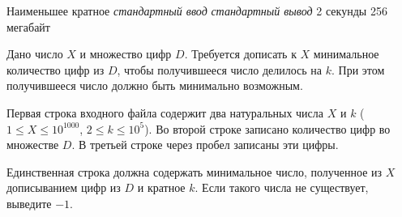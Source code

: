\begin{problem}%
{Наименьшее кратное}%
{\textsl{стандартный ввод}}%
{\textsl{стандартный вывод}}%
{2 секунды}%
{256 мегабайт}{}

Дано число $X$ и множество цифр $D$. Требуется дописать к $X$ минимальное количество цифр из $D$, чтобы получившееся число делилось на $k$. При этом получившееся число должно быть минимально возможным.

\InputFile

Первая строка входного файла содержит два натуральных числа $X$ и $k$ ($1 \leqslant X \leqslant 10^{1000}$, $2 \leqslant k \leqslant 10^5$). Во второй строке записано количество цифр во множестве $D$. В третьей строке через пробел записаны эти цифры.

\OutputFile

Единственная строка должна содержать минимальное число, полученное из $X$ дописыванием цифр из $D$ и кратное $k$. Если такого числа не существует, выведите $-1$.

\Examples

\begin{example}
%
%
\end{example}
\end{problem}
